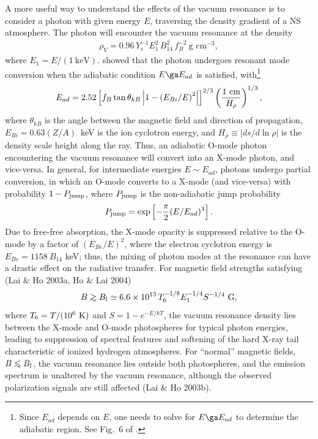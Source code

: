 \documentclass[useAMS,onecolumn,usenatbib,usegraphicx]{mn2e}
\def\be{\begin{equation}}
\def\ee{\end{equation}}
\def\go{\mathrel{\raise.3ex\hbox{$>$}\mkern-14mu\lower0.6ex\hbox{$\sim$}}}
\def\lo{\mathrel{\raise.3ex\hbox{$<$}\mkern-14mu\lower0.6ex\hbox{$\sim$}}}
\begin{document}
A more useful way to understand the effects of the
vacuum resonance is to consider a photon with given energy $E$,
traversing the density gradient of a NS atmosphere.  The photon will
encounter the vacuum resonance at the density
\begin{eqnarray}
\rho_V = 0.96\, Y_e^{-1} E_1^2\,
B_{14}^2\, f_B^{-2}\ \mbox{g cm}^{-3},
\end{eqnarray}
where $E_1=E/(1\ \mbox{keV})$.
\citet[][]{LaiHo02a} showed that the photon undergoes resonant mode 
conversion when the adiabatic condition $E\ga E_{ad}$ is satisfied, with\footnote{Since $E_{ad}$ depends on
$E$, one needs to solve for $E\ga E_{ad}$ to determine the adiabatic region.  See Fig.~6 of 
\citet[][]{LaiHo03a}.}
\begin{eqnarray}
E_{ad}=
2.52\left[f_B\tan\theta_{kB}\left|1-\left({E_{Bi}/E}\right)^2\right|
\right]^{2/3}\left({1\ \mbox{cm}\over H_{\rho}}\right)^{1/3},
\end{eqnarray}
where $\theta_{kB}$ is the angle between the magnetic field and
direction of propagation, $E_{Bi}=0.63(Z/A)$~keV is the ion cyclotron
energy, and $H_{\rho}\equiv |ds/d\ln\rho|$ is the density scale height
along the ray.  Thus, an adiabatic O-mode photon encountering the
vacuum resonance will convert into an X-mode photon, and vice-versa.
In general, for intermediate energies $E\sim E_{ad}$, photons undergo partial
conversion, in which an O-mode converts to a X-mode (and
vice-versa) with probability $1-P_{\rm jump}$, where $P_{\rm jump}$ is the non-adiabatic 
jump probability
\be
\label{eq:P_j}
P_{\rm jump}=\exp\left[-{\pi\over 2}(E/E_{ad})^3\right].
\ee
Due to free-free absorption, the X-mode opacity is
suppressed relative to the O-mode by a factor of
$(E_{Be}/E)^2$, where the electron cyclotron energy is $E_{Be}=1158~B_{14}$ keV; 
thus, the 
mixing of photon modes at the resonance can have a drastic effect on
the radiative transfer. For magnetic field strengths satisfying
(Lai \& Ho 2003a, Ho \& Lai 2004)
\be
B \go B_l \simeq 6.6\times 10^{13}\, T_6^{-1/8}E_1^{-1/4}S^{-1/4}\mbox{ G},
\label{eq:maglim}
\ee
where $T_6=T/(10^6~{\rm K})$ and
$S=1-e^{-E/kT}$, 
the vacuum resonance density lies between the X-mode
and O-mode photospheres for typical photon energies, 
leading to suppression of spectral features and
softening of the hard X-ray tail characteristic of ionized hydrogen
atmospheres. For ``normal'' magnetic fields, $B\lo B_l$, the vacuum resonance 
lies outside both photospheres, and the emission spectrum is 
unaltered by the vacuum resonance, although the observed polarization 
signals are still affected (Lai \& Ho 2003b).
\end{document}
